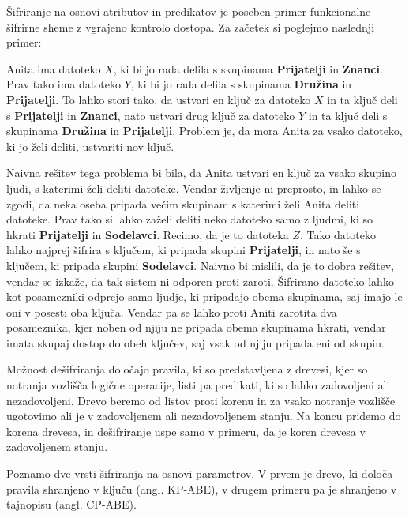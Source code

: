 \documentclass[12pt,a4paper,openany,tikz]{book}
\theoremstyle{plain}
\theoremstyle{definition}
\begin{document}
Šifriranje na osnovi atributov in predikatov je poseben primer funkcionalne šifrirne sheme z vgrajeno kontrolo dostopa. Za začetek si poglejmo naslednji primer:

Anita ima datoteko $X$, ki bi jo rada delila s skupinama \textbf{Prijatelji} in \textbf{Znanci}. Prav tako ima datoteko $Y$, ki bi jo rada delila s skupinama \textbf{Družina} in \textbf{Prijatelji}. To lahko stori tako, da ustvari en ključ za datoteko $X$ in ta ključ deli s \textbf{Prijatelji} in  \textbf{Znanci}, nato ustvari drug ključ za datoteko $Y$ in ta ključ deli s skupinama \textbf{Družina} in \textbf{Prijatelji}. Problem je, da mora Anita za vsako datoteko, ki jo želi deliti, ustvariti nov ključ.

Naivna rešitev tega problema bi bila, da Anita ustvari en ključ za vsako skupino ljudi, s katerimi želi deliti datoteke. Vendar življenje ni preprosto, in lahko se zgodi, da neka oseba pripada večim skupinam s katerimi želi Anita deliti datoteke. Prav tako si lahko zaželi deliti neko datoteko samo z ljudmi, ki so hkrati \textbf{Prijatelji} in \textbf{Sodelavci}. Recimo, da je to datoteka $Z$. Tako datoteko lahko najprej šifrira s ključem, ki pripada skupini \textbf{Prijatelji}, in nato še s ključem, ki pripada skupini \textbf{Sodelavci}. Naivno bi mislili, da je to dobra rešitev, vendar se izkaže, da tak sistem ni odporen proti zaroti. Šifrirano datoteko lahko kot posamezniki odprejo samo ljudje, ki pripadajo obema skupinama, saj imajo le oni v posesti oba ključa. Vendar pa se lahko proti Aniti zarotita dva posameznika, kjer noben od njiju ne pripada obema skupinama hkrati, vendar imata skupaj dostop do obeh ključev, saj vsak od njiju pripada eni od skupin.

Možnost dešifriranja določajo pravila, ki so predstavljena z drevesi, kjer so notranja vozlišča logične operacije, listi pa predikati, ki so lahko zadovoljeni ali nezadovoljeni. Drevo beremo od listov proti korenu in za vsako notranje vozlišče ugotovimo ali je v zadovoljenem ali nezadovoljenem stanju. Na koncu pridemo do korena drevesa, in dešifriranje uspe samo v primeru, da je koren drevesa v zadovoljenem stanju.

Poznamo dve vrsti šifriranja na osnovi parametrov. V prvem je drevo, ki določa pravila shranjeno v ključu  (angl. \acrlong{KP-ABE}), v drugem primeru pa je shranjeno v tajnopisu (angl. \acrlong{CP-ABE}).
\end{document}
